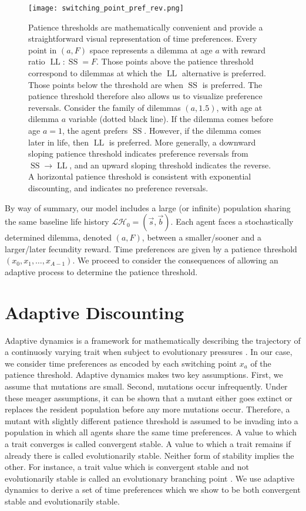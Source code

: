 \documentclass[titlepage, hidelinks, 12pt]{article}
\theoremstyle{plain}
\theoremstyle{remark}
\theoremstyle{definition}
\newcommand{\LH}{\mathcal{LH}}
\DeclareMathOperator{\smallersooner}{SS}
\DeclareMathOperator{\largerlater}{LL}
\begin{document}
\begin{figure}[H]
    \centering
    \texttt{[image: switching\_point\_pref\_rev.png]}
    \caption[Patience threshold and alternative perspective on preference reversals.]{Patience thresholds are mathematically convenient and provide a straightforward visual representation of time preferences. 
        Every point in $(a, F)$ space
    represents a dilemma at age $a$ with reward ratio $\largerlater : \smallersooner = F$. 
    Those points above the patience threshold correspond to dilemmas at which the $\largerlater$ alternative
is preferred. Those points below the threshold are when $\smallersooner$ is preferred. The patience threshold therefore also allows
us to visualize preference reversals. Consider the family of dilemmas $(a, 1.5)$, with age at dilemma $a$ variable (dotted black line). If the dilemma comes 
before age $a = 1$, the agent 
prefers $\smallersooner$. However, if the dilemma comes later in life, then $\largerlater$ is preferred. More generally, a
downward sloping patience threshold indicates preference reversals from $\smallersooner\to\largerlater$, and an upward sloping threshold
indicates the reverse. A horizontal patience threshold is consistent with exponential discounting, and indicates no preference reversals.
}
\end{figure}

By way of summary, our model includes a large (or infinite) population sharing the same baseline life history $\LH_0 = (\vec{s}, \vec{b}).$ 
Each agent faces a stochastically determined dilemma, denoted $(a, F)$, between a smaller/sooner and a larger/later fecundity reward. 
Time preferences are given by a patience threshold $(x_0, x_1, \ldots, x_{A-1})$. 
We proceed to consider the consequences of allowing an adaptive process to determine the patience threshold. 


\section{Adaptive Discounting}
Adaptive dynamics is a framework for mathematically describing the trajectory of a continuosly varying trait when subject to evolutionary pressures 
\cite{doebeli05}. In our case, we consider time preferences as encoded by each switching point $x_a$ of the patience threshold.
Adaptive dynamics makes two key assumptions. First, we assume that mutations are small. Second, mutations occur infrequently.
Under these meager assumptions, it can be shown that a mutant either goes extinct or replaces the resident population before any more mutations occur.
Therefore, a mutant with slightly different patience threshold is assumed to be invading into a population in which all agents share the same
time preferences. 
A value to which a trait converges is called convergent stable. A value to which a trait remains if already there is called evolutionarily stable.
Neither form of stability implies the other. For instance, a trait value which is convergent stable and not evolutionarily stable is called an
evolutionary branching point \cite{doebeli11}. We use adaptive dynamics
to derive a set of time preferences which we show to be both convergent stable and evolutionarily stable. 
\end{document}
